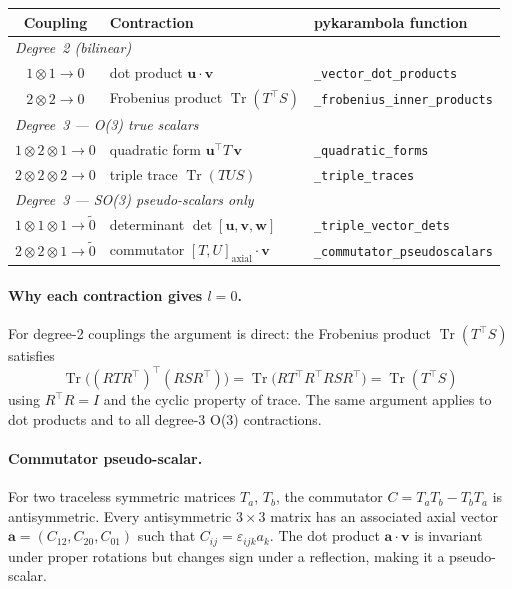 \documentclass[11pt,a4paper]{article}
\begin{document}
\medskip
\begin{center}
\renewcommand{\arraystretch}{1.3}
\begin{tabular}{cll}
\toprule
Coupling & Contraction & pykarambola function \\
\midrule
\multicolumn{3}{l}{\textit{Degree~2 (bilinear)}} \\
$1 \otimes 1 \to 0$ & dot product $\mathbf{u} \cdot \mathbf{v}$ & \texttt{\_vector\_dot\_products} \\
$2 \otimes 2 \to 0$ & Frobenius product $\operatorname{Tr}(T^\top S)$ & \texttt{\_frobenius\_inner\_products} \\
\multicolumn{3}{l}{\textit{Degree~3 — O(3) true scalars}} \\
$1 \otimes 2 \otimes 1 \to 0$ & quadratic form $\mathbf{u}^\top T\, \mathbf{v}$ & \texttt{\_quadratic\_forms} \\
$2 \otimes 2 \otimes 2 \to 0$ & triple trace $\operatorname{Tr}(TUS)$ & \texttt{\_triple\_traces} \\
\multicolumn{3}{l}{\textit{Degree~3 — SO(3) pseudo-scalars only}} \\
$1 \otimes 1 \otimes 1 \to \tilde{0}$ & determinant $\det[\mathbf{u},\mathbf{v},\mathbf{w}]$ & \texttt{\_triple\_vector\_dets} \\
$2 \otimes 2 \otimes 1 \to \tilde{0}$ & commutator $[T,U]_{\text{axial}} \cdot \mathbf{v}$ & \texttt{\_commutator\_pseudoscalars} \\
\bottomrule
\end{tabular}
\end{center}
\medskip

\paragraph{Why each contraction gives $l=0$.}
For degree-2 couplings the argument is direct: the Frobenius product
$\operatorname{Tr}(T^\top S)$ satisfies
\[
  \operatorname{Tr}\!\bigl((RT R^\top)^\top (RS R^\top)\bigr)
  = \operatorname{Tr}\!\bigl(R T^\top R^\top R S R^\top\bigr)
  = \operatorname{Tr}(T^\top S)
\]
using $R^\top R = I$ and the cyclic property of trace.
The same argument applies to dot products and to all degree-3 O(3) contractions.

\paragraph{Commutator pseudo-scalar.}
For two traceless symmetric matrices $T_a$, $T_b$, the commutator
$C = T_a T_b - T_b T_a$ is antisymmetric.
Every antisymmetric $3\times3$ matrix has an associated axial vector
$\mathbf{a} = (C_{12}, C_{20}, C_{01})$ such that $C_{ij} = \varepsilon_{ijk} a_k$.
The dot product $\mathbf{a} \cdot \mathbf{v}$ is invariant under proper rotations
but changes sign under a reflection, making it a pseudo-scalar.
\end{document}
